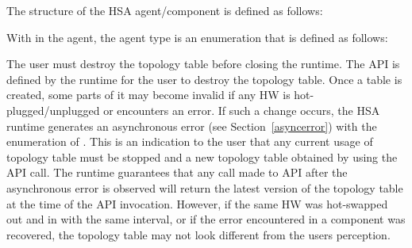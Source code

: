 The structure of the HSA agent/component is defined as follows:


With in the agent, the agent type is an enumeration that is defined
as follows:


The user must destroy the topology table before closing the runtime.
The  API is defined by the
runtime for the user to destroy the topology table. Once a table is
created, some parts of it may become invalid if any HW is
hot-plugged/unplugged or encounters an error. If such a change
occurs, the HSA runtime generates an asynchronous error (see
Section~\ref{asyncerror}) with the  enumeration
of . This is an indication to the
user that any current usage of topology table must be stopped and a
new topology table obtained by using the
 API call. The runtime guarantees
that any call made to  API after
the asynchronous error is observed will return the latest version of
the topology table at the time of the API invocation. However, if
the same HW was hot-swapped out and in with the same interval, or if
the error encountered in a component was recovered, the topology
table may not look different from the users perception. 

